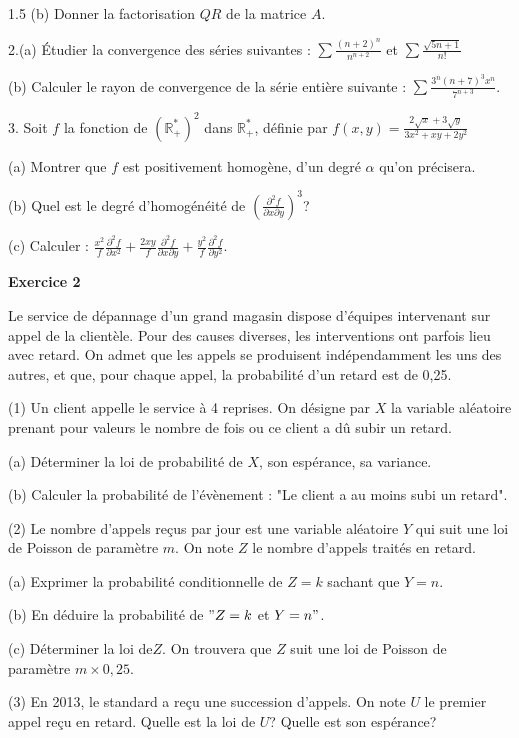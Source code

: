 \documentclass[12pt]{article}
\begin{document}
\begin{spacing}{1.5}
(b) Donner la factorisation $QR$ de la matrice $A$.

2.(a) Étudier la convergence des séries suivantes : $\sum\frac{(n+2)^n}{n^{n+2}}$ et $\sum\frac{\sqrt{5n+1}}{n!}$

 (b) Calculer le rayon de convergence de la série entière suivante : $\sum \frac{3^n(n+7)^3x^n}{7^{n+3}}$.
 
3. Soit $f$ la fonction de $(\mathbb{R}_{+}^{*})^2$ dans $\mathbb{R}_{+}^{*}$, définie par $f(x,y)=\frac{2\sqrt{x}+3\sqrt{y}}{3x^2+xy+2y^2}$

 (a) Montrer que $f$ est positivement homogène, d'un degré $\alpha$ qu'on précisera.
 
 (b) Quel est le degré d'homogénéité de $(\frac{\partial^2f}{\partial x\partial y})^3$?
 
 (c) Calculer : $\frac{x^2}{f}\frac{\partial^2f}{\partial x^2}+\frac{2xy}{f}\frac{\partial^2f}{\partial x\partial y}+\frac{y^2}{f}\frac{\partial^2f}{\partial y^2}$.
 
\medskip\textbf{Exercice 2}

 Le service de dépannage d'un grand magasin dispose d'équipes intervenant sur appel de la clientèle. Pour des causes diverses, les interventions ont parfois lieu avec retard. On admet que les appels se produisent indépendamment les uns des autres, et que, pour chaque appel, la probabilité d'un retard est de 0,25.
 
 (1) Un client appelle le service à 4 reprises. On désigne par $X$ la variable aléatoire prenant pour valeurs le nombre de fois ou ce client a dû subir un retard.
 
 (a) Déterminer la loi de probabilité de $X$, son espérance, sa variance.
 
 (b) Calculer la probabilité de l'évènement : "Le client a au moins subi un retard".
 
 (2) Le nombre d'appels reçus par jour est une variable aléatoire $Y$ qui suit une loi de
 Poisson de paramètre $m$. On note $Z$ le nombre d'appels traités en retard.
 
 (a) Exprimer la probabilité conditionnelle de $Z = k$ sachant que $Y = n$.
 
 (b) En déduire la probabilité de $"Z = k$ et $Y = n"$.
 
 (c) Déterminer la loi de$ Z$. On trouvera que $Z$ suit une loi de Poisson de paramètre
 $m\times 0,25$.
 
 (3) En 2013, le standard a reçu une succession d'appels. On note $U$ le premier appel reçu en retard. Quelle est la loi de $U$? Quelle est son espérance?
 

\end{spacing}
\end{document}
